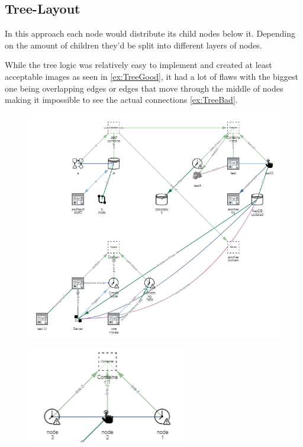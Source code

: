 \subsection{Tree-Layout}
In this approach each node would distribute its child nodes below it. Depending on the amount of children they'd be split into different layers of nodes.

While the tree logic was relatively easy to implement and created at least acceptable images as seen in \autoref{ex:TreeGood}, it had a lot of flaws with the biggest one being overlapping edges or edges that move through the middle of nodes making it impossible to see the actual connections \autoref{ex:TreeBad}.

\begin{figure}[H]
\label{ex:TreeGood}
\centering
\includegraphics[scale=.7]{Bilder/TreeGood.png}
\end{figure}

\begin{figure}[H]
\label{ex:TreeBad}
\centering
\includegraphics[scale=1]{Bilder/TreeBad.png}
\end{figure}

